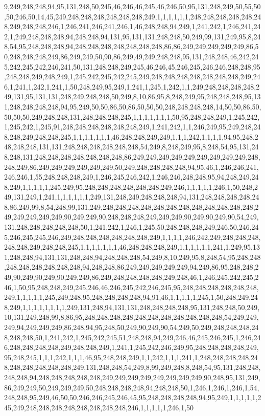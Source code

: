 9,249,248,248,94,95,131,248,50,245,46,246,46,245,46,246,50,95,131,248,249,50,55,50,50,246,50,14,45,249,248,248,248,248,248,248,249,1,1,1,1,1,1,248,248,248,248,248,248,249,248,248,246,1,246,241,246,241,246,1,46,248,248,94,249,1,241,242,1,246,241,242,1,249,248,248,248,94,248,248,94,131,95,131,131,248,248,50,249,99,131,249,95,8,248,54,95,248,248,248,94,248,248,248,248,248,248,248,86,86,249,249,249,249,249,86,50,248,248,248,249,86,249,249,50,90,86,249,49,249,248,248,95,131,248,248,46,242,245,242,245,242,246,241,50,131,248,248,249,245,46,246,45,246,245,246,246,248,248,95,248,248,249,248,249,1,245,242,245,242,245,249,248,248,248,248,248,248,248,249,246,1,241,1,242,1,241,1,50,248,249,95,249,1,241,1,245,1,242,1,1,249,248,248,248,248,249,131,95,131,131,248,249,248,248,50,249,8,10,86,95,8,248,249,95,248,248,248,95,131,248,248,248,248,94,95,249,50,50,86,50,86,50,50,50,248,248,248,248,14,50,50,86,50,50,50,50,249,248,248,131,248,248,248,245,1,1,1,1,1,1,1,50,95,248,248,249,1,245,242,1,245,242,1,245,91,248,248,248,248,248,248,249,1,241,242,1,1,246,249,95,249,248,248,248,249,248,248,245,1,1,1,1,1,1,1,46,248,248,249,249,1,1,1,242,1,1,1,1,94,95,248,248,248,248,131,131,248,248,248,248,248,248,54,249,8,248,249,95,8,248,54,95,131,248,248,131,248,248,248,248,248,248,248,86,249,249,249,249,249,249,249,249,249,248,248,249,86,249,249,249,249,249,249,50,249,248,248,248,248,94,95,46,1,246,246,241,246,246,1,55,248,248,248,249,1,246,245,246,242,1,246,246,248,248,95,94,248,249,248,249,1,1,1,1,1,245,249,95,248,248,248,248,248,248,249,246,1,1,1,1,1,246,1,50,248,249,131,249,1,241,1,1,1,1,1,1,249,131,248,249,248,248,248,94,131,248,248,248,248,248,86,249,99,8,54,248,99,131,249,248,248,248,248,248,248,248,248,248,248,248,248,249,249,249,249,249,90,249,249,90,248,248,248,249,249,249,90,249,90,249,90,54,249,131,248,248,248,248,248,50,1,241,242,1,246,1,245,50,248,248,248,249,246,50,246,245,246,245,245,246,249,248,248,248,248,248,248,249,1,1,1,1,246,242,249,248,248,248,248,248,249,248,248,245,1,1,1,1,1,1,1,46,248,248,248,249,1,1,1,1,1,1,241,1,249,95,131,248,248,94,131,131,248,248,94,248,248,248,54,249,8,10,249,95,8,248,54,95,248,248,248,248,248,248,248,248,94,248,248,86,249,249,249,249,249,94,249,86,95,248,248,249,90,249,90,249,90,249,249,86,249,248,248,248,248,249,248,46,1,246,245,242,245,246,1,50,95,248,248,249,245,246,46,246,245,242,246,245,95,248,248,248,248,248,248,249,1,1,1,1,1,245,249,248,95,248,248,248,248,94,91,46,1,1,1,1,1,245,1,50,248,249,248,249,1,1,1,1,1,1,1,1,249,131,248,94,131,131,248,248,248,248,95,131,248,248,50,249,10,131,249,248,99,8,86,95,248,248,248,248,248,248,248,248,248,248,248,54,249,249,249,94,249,249,249,86,248,94,95,248,50,249,90,249,90,54,249,50,249,248,248,248,248,248,248,50,1,241,242,1,245,242,245,51,248,248,94,249,246,46,245,246,245,1,246,246,248,248,248,248,249,248,248,249,1,241,1,245,242,246,249,95,248,248,248,248,249,95,248,245,1,1,1,242,1,1,1,46,95,248,248,249,1,1,242,1,1,1,241,1,248,248,248,248,248,248,248,248,248,248,249,131,248,248,54,249,8,99,249,248,8,248,54,95,131,248,248,248,248,94,248,248,248,248,248,249,249,249,249,249,249,249,249,90,248,95,131,249,86,249,249,50,249,249,249,50,248,248,248,248,94,248,248,50,1,246,1,246,1,246,1,54,248,248,95,249,46,50,50,246,246,245,246,45,95,248,248,248,248,94,95,249,1,1,1,1,1,245,249,248,248,248,248,248,248,248,248,246,1,1,1,1,1,246,1,50